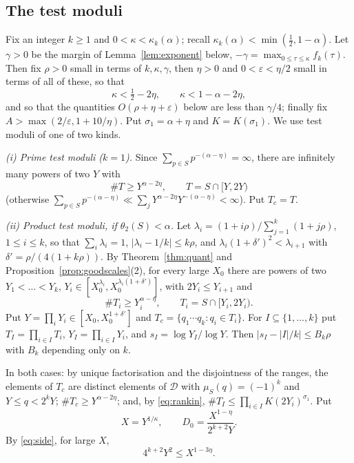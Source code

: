 \documentclass[11pt]{amsart}
\theoremstyle{remark}
\numberwithin{equation}{section}
\newcommand{\cD}{\mathcal{D}}
\newcommand{\eps}{\varepsilon}
\begin{document}
\subsection{The test moduli}
Fix an integer $k\ge1$ and $0<\kappa<\kappa_k(\alpha)$; recall $\kappa_k(\alpha)<\min(\tfrac12,1-\alpha)$. Let $\gamma>0$ be the margin of Lemma~\ref{lem:exponent} below, $-\gamma=\max_{0\le\tau\le\kappa}f_k(\tau)$. Then fix $\rho>0$ small in terms of $k,\kappa,\gamma$, then $\eta>0$ and $0<\eps<\eta/2$ small in terms of all of these, so that
\begin{equation}\label{eq:side}
\kappa<\tfrac12-2\eta,\qquad \kappa<1-\alpha-2\eta,
\end{equation}
and so that the quantities $O(\rho+\eta+\eps)$ below are less than $\gamma/4$; finally fix $A>\max(2/\eps,1+10/\eta)$. Put $\sigma_1=\alpha+\eta$ and $K=K(\sigma_1)$. We use test moduli of one of two kinds.

\emph{(i) Prime test moduli ($k=1$).} Since $\sum_{p\in S}p^{-(\alpha-\eta)}=\infty$, there are infinitely many powers of two $Y$ with
\begin{equation}\label{eq:Tlarge}
\#T\ge Y^{\alpha-2\eta},\qquad T=S\cap[Y,2Y)
\end{equation}
(otherwise $\sum_{p\in S}p^{-(\alpha-\eta)}\ll\sum_jY^{\alpha-2\eta}Y^{-(\alpha-\eta)}<\infty$). Put $T_c=T$.

\emph{(ii) Product test moduli, if $\theta_2(S)<\alpha$.} Let $\lambda_i=(1+i\rho)/\sum_{j=1}^k(1+j\rho)$, $1\le i\le k$, so that $\sum_i\lambda_i=1$, $|\lambda_i-1/k|\le k\rho$, and $\lambda_i(1+\delta')^2<\lambda_{i+1}$ with $\delta'=\rho/(4(1+k\rho))$. By Theorem~\ref{thm:quant} and Proposition~\ref{prop:goodscales}(2), for every large $X_0$ there are powers of two $Y_1<\dots<Y_k$, $Y_i\in[X_0^{\lambda_i},X_0^{\lambda_i(1+\delta')}]$, with $2Y_i\le Y_{i+1}$ and
\[
\#T_i\ge Y_i^{\alpha-\eta},\qquad T_i=S\cap[Y_i,2Y_i).
\]
Put $Y=\prod_iY_i\in[X_0,X_0^{1+\delta'}]$ and $T_c=\{q_1\cdots q_k:q_i\in T_i\}$. For $I\subseteq\{1,\dots,k\}$ put $T_I=\prod_{i\in I}T_i$, $Y_I=\prod_{i\in I}Y_i$, and $s_I=\log Y_I/\log Y$. Then $|s_I-|I|/k|\le B_k\rho$ with $B_k$ depending only on $k$.

In both cases: by unique factorisation and the disjointness of the ranges, the elements of $T_c$ are distinct elements of $\cD$ with $\mu_S(q)=(-1)^k$ and $Y\le q<2^kY$; $\#T_c\ge Y^{\alpha-2\eta}$; and, by \eqref{eq:rankin}, $\#T_I\le\prod_{i\in I}K(2Y_i)^{\sigma_1}$. Put
\[
X=Y^{1/\kappa},\qquad D_0=\frac{X^{1-\eta}}{2^{k+2}Y}.
\]
By \eqref{eq:side}, for large $X$,
\begin{equation}\label{eq:C1}
4^{k+2}Y^2\le X^{1-3\eta}.
\end{equation}
\end{document}
